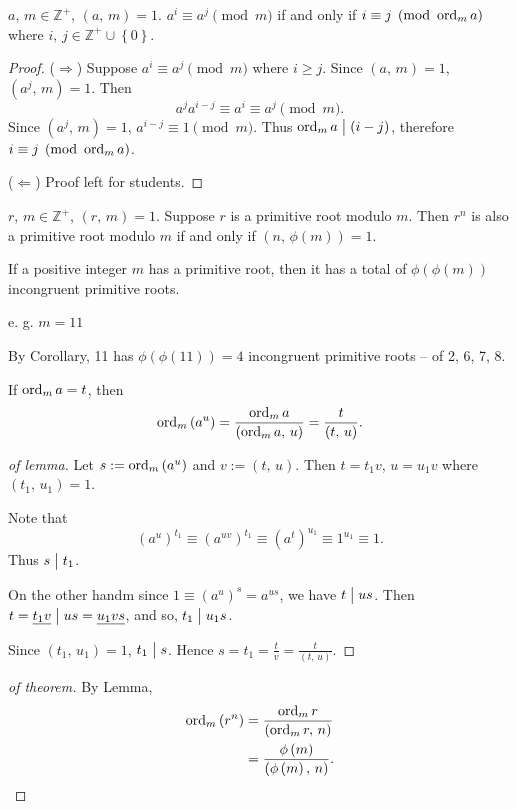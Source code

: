 \begin{theorem}
    $a,\,m \in \mathbb{Z}^+$, $\left(a,\,m\right)=1$.
    $a^i \equiv a^j \pmod{m}$ if and only if $i \equiv j \pmod{\operatorname{\mathrm{ord}}_m a}$ where
    $i,\,j \in \mathbb{Z}^+ \cup \left\{0\right\}$.
\end{theorem}
\begin{proof}
    ($\Rightarrow$) Suppose $a^i \equiv a^j \pmod{m}$ where $i \geq j$. Since
    $\left(a,\,m\right)=1$, $\left(a^j,\,m\right)=1$. Then
    \[
        a^ja^{i-j} \equiv a^i \equiv a^j \pmod{m}.
    \]
    Since $\left(a^j,\,m\right)=1$, $a^{i-j}\equiv 1 \pmod{m}$.
    Thus $\operatorname{\mathrm{ord}}_m a \bigm| \left(i-j\right)$, therefore $i \equiv j \pmod{\operatorname{\mathrm{ord}}_m a}$.

    ($\Leftarrow$) Proof left for students.
\end{proof}

\begin{theorem}
    $r,\,m \in \mathbb{Z}^+$, $\left(r,\,m\right)=1$.
    Suppose $r$ is a primitive root modulo $m$. Then $r^n$ is also a 
    primitive root modulo $m$ if and only if $\left(n,\,\phi\left(m\right)\right)=1$.
\end{theorem}

\begin{corollary}
    If a positive integer $m$ has a primitive root, then it has a total of
    \underline{$\phi\left(\phi\left(m\right)\right)$} incongruent primitive roots.
\end{corollary}

e. g. $m=11$

By Corollary, 11 has $\phi\left(\phi\left(11\right)\right)=4$ incongruent
primitive roots -- of 2, 6, 7, 8.

\begin{lemma}
    If $\operatorname{\mathrm{ord}}_m a = t$, then \[\operatorname{\mathrm{ord}}_m \left(a^u\right) = \frac{\operatorname{\mathrm{ord}}_m a}{\left(\operatorname{\mathrm{ord}}_m a,\,u\right)} = \frac{t}{\left(t,\,u\right)}.\]
\end{lemma}

\begin{proof}[of lemma]
    Let $s:=\operatorname{\mathrm{ord}}_m\left(a^u\right)$ and $v:=\left(t,\,u\right)$. Then
    $t=t_1 v$, $u=u_1 v$ where $\left(t_1,\,u_1\right)=1$.

    Note that
    \[
        \left(a^u\right)^{t_1} \equiv \left(a^{uv}\right)^{t_1}
        \equiv \left(a^t\right)^{u_1} \equiv 1^{u_1} \equiv 1.
    \]
    Thus $s \bigm| t_1$.

    On the other handm since $1\equiv\left(a^u\right)^s =a^{us}$, we have $t \bigm| us$.
    Then $t=\underline{t_1 v} \bigm| us = \underline{u_1 vs}$, and so, $t_1 \bigm| u_1s$.

    Since $\left(t_1,\,u_1\right)=1$, $t_1 \bigm| s$. Hence $s=t_1=\frac{t}{v}=\frac{t}{\left(t,\,u\right)}$.
\end{proof}

\begin{proof}[of theorem]
    By Lemma,
    \begin{align*}
        \operatorname{\mathrm{ord}}_m \left(r^n\right) &= \frac{\operatorname{\mathrm{ord}}_m r}{\left(\operatorname{\mathrm{ord}}_m r,\,n\right)} \\
        &= \frac{\phi\left(m\right)}{\left(\phi\left(m\right),\,n\right)}.
    \end{align*}
\end{proof}
